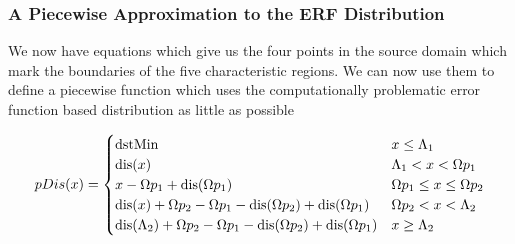 %

\subsubsection{A Piecewise Approximation to the ERF Distribution}
We now have equations which give us the four points in the source domain which mark the boundaries of the five characteristic regions. We can now use them to define a piecewise function which uses the computationally problematic error function based distribution as little as possible

\begin{equation}
pDis(x) = \begin{cases}
\text{dstMin} & x \le \Lambda_1 \\
\text{dis}(x) & \Lambda_1 < x < \Omega p_1 \\
x - \Omega p_1 + \text{dis}(\Omega p_1) & \Omega p_1 \le x \le \Omega p_2  \\
\text{dis}(x) + \Omega p_2 - \Omega p_1 - \text{dis}(\Omega p_2) + \text{dis}(\Omega p_1)  & \Omega p_2 < x < \Lambda_2  \\
\text{dis}(\Lambda_2) + \Omega p_2 - \Omega p_1 - \text{dis}(\Omega p_2) + \text{dis}(\Omega p_1) & x \ge \Lambda_2 \\
\end{cases}
\end{equation}

